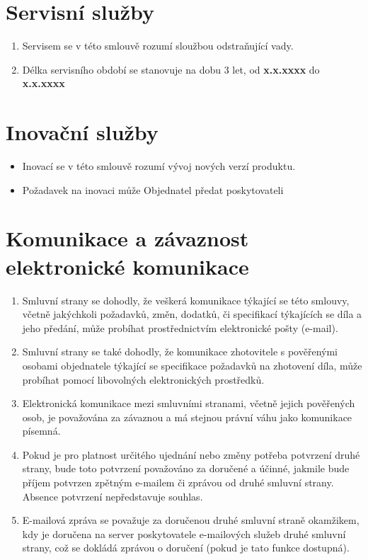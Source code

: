 \documentclass[]{article}
\begin{document}
\section{Servisní služby}
\begin{enumerate}
	\item Servisem se v této smlouvě rozumí sloužbou odstraňující vady.
	\item Délka servisního období se stanovuje na dobu 3 let, od \textbf{x.x.xxxx} do \textbf{x.x.xxxx}
	
\end{enumerate}

\section{Inovační služby}
\begin{itemize}
	\item Inovací se v této smlouvě rozumí vývoj nových verzí produktu.
	\item Požadavek na inovaci může Objednatel předat poskytovateli
\end{itemize}

\section{Komunikace a závaznost elektronické komunikace}
\label{clanek:komunikace}
\begin{enumerate}
	\item Smluvní strany se dohodly, že veškerá komunikace týkající se této smlouvy, včetně jakýchkoli požadavků, změn, dodatků, či specifikací týkajících se díla a jeho předání, může probíhat prostřednictvím elektronické pošty (e-mail).
	\item Smluvní strany se také dohodly, že komunikace zhotovitele s pověřenými osobami objednatele týkající se specifikace požadavků na zhotovení díla, může probíhat pomocí libovolných elektronických prostředků.
	\item Elektronická komunikace mezi smluvními stranami, včetně jejich pověřených osob, je považována za závaznou a má stejnou právní váhu jako komunikace písemná.
	\item Pokud je pro platnost určitého ujednání nebo změny potřeba potvrzení druhé strany, bude toto potvrzení považováno za doručené a účinné, jakmile bude příjem potvrzen zpětným e-mailem či zprávou od druhé smluvní strany. Absence potvrzení nepředstavuje souhlas.
	\item E-mailová zpráva se považuje za doručenou druhé smluvní straně okamžikem, kdy je doručena na server poskytovatele e-mailových služeb druhé smluvní strany, což se dokládá zprávou o doručení (pokud je tato funkce dostupná).
\end{enumerate}
\end{document}
